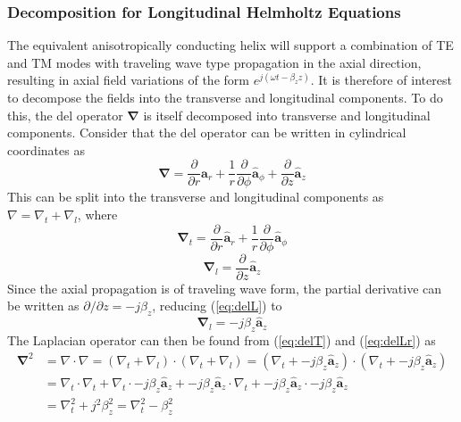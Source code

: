 \subsubsection{Decomposition for Longitudinal Helmholtz Equations}\label{subsubsec:decomposition}
The equivalent anisotropically conducting helix will support a combination of TE and TM modes with traveling wave type propagation in the axial direction, resulting in axial field variations of the form $e^{j(\omega t-\beta_z z)}$. It is therefore of interest to decompose the fields into the transverse and longitudinal components. To do this, the del operator $\mathbf{\nabla}$ is itself decomposed into transverse and longitudinal components. Consider that the del operator can be written in cylindrical coordinates as
\begin{equation}\label{eq:delCyl}
	\mathbf{\nabla} = \frac{\partial}{\partial r}\hat{\mathbf{a}}_{r} + \frac{1}{r}\frac{\partial}{\partial \phi}\hat{\mathbf{a}}_{\phi} + \frac{\partial}{\partial z}\hat{\mathbf{a}}_{z}
\end{equation}
This can be split into the transverse and longitudinal components as $\nabla = \nabla_t + \nabla_l$, where 
\begin{equation}\label{eq:delT}
	\mathbf{\nabla}_t = \frac{\partial}{\partial r}\hat{\mathbf{a}}_{r} + \frac{1}{r}\frac{\partial}{\partial \phi}\hat{\mathbf{a}}_{\phi}
\end{equation}
\begin{equation}\label{eq:delL}
	\mathbf{\nabla}_l = \frac{\partial}{\partial z}\hat{\mathbf{a}}_{z}
\end{equation}
Since the axial propagation is of traveling wave form, the partial derivative can be written as $\partial / \partial z = -j\beta_z$, reducing (\ref{eq:delL}) to
\begin{equation}\label{eq:delLr}
	\mathbf{\nabla}_l = -j\beta_z\hat{\mathbf{a}}_{z}
\end{equation}
The Laplacian operator can then be found from (\ref{eq:delT}) and (\ref{eq:delLr}) as
\begin{equation}\label{eq:Laplacian}
	\begin{split}
	\mathbf{\nabla}^2 &= \nabla \cdot \nabla = (\nabla_t + \nabla_l) \cdot (\nabla_t + \nabla_l) = (\nabla_t + -j\beta_z\hat{\mathbf{a}}_{z}) \cdot (\nabla_t + -j\beta_z\hat{\mathbf{a}}_{z}) \\ 
	&= \nabla_t \cdot \nabla_t + \nabla_t \cdot -j\beta_z\hat{\mathbf{a}}_{z} + -j\beta_z\hat{\mathbf{a}}_{z} \cdot \nabla_t + -j\beta_z\hat{\mathbf{a}}_{z} \cdot -j\beta_z\hat{\mathbf{a}}_{z} \\
	&= \nabla_t^2 + j^2\beta_z^2 = \nabla_t^2 - \beta_z^2
	\end{split}
\end{equation}

